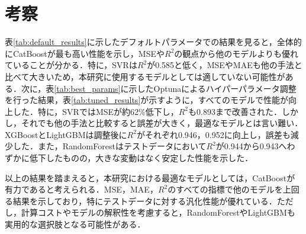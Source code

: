 \section{考察}
表\ref{tab:default_results}に示したデフォルトパラメータでの結果を見ると，全体的にCatBoostが最も高い性能を示し，MSEや$R^2$の観点から他のモデルよりも優れていることが分かる．特に，SVRは$R^2$が0.585と低く，MSEやMAEも他の手法と比べて大きいため，本研究に使用するモデルとしては適していない可能性がある．次に，表\ref{tab:best_params}に示したOptunaによるハイパーパラメータ調整を行った結果，表\ref{tab:tuned_results}が示すように，すべてのモデルで性能が向上した．特に，SVRではMSEが約62\%低下し，$R^2$も0.893まで改善された．しかし，それでも他の手法と比較すると誤差が大きく，最適なモデルとは言い難い．XGBoostとLightGBMは調整後に$R^2$がそれぞれ0.946，0.952に向上し，誤差も減少した．また，RandomForestはテストデータにおいて$R^2$が0.944から0.943へわずかに低下したものの，大きな変動はなく安定した性能を示した．

以上の結果を踏まえると，本研究における最適なモデルとしては，CatBoostが有力であると考えられる．MSE，MAE，$R^2$のすべての指標で他のモデルを上回る結果を示しており，特にテストデータに対する汎化性能が優れている．ただし，計算コストやモデルの解釈性を考慮すると，RandomForestやLightGBMも実用的な選択肢となる可能性がある．
